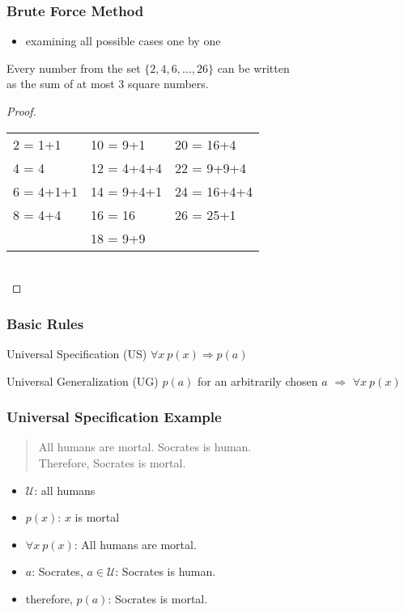 \documentclass[dvipsnames]{beamer}
\begin{document}
\begin{frame}
  \frametitle{Brute Force Method}

  \begin{itemize}
    \item examining all possible cases one by one
  \end{itemize}

  \pause
  \begin{theorem}
    Every number from the set $\{2,4,6,\dots,26\}$ can be written\\
    as the sum of at most 3 square numbers.
  \end{theorem}

  \pause
  \begin{proof}
    \begin{tabular}{lll}
      2 = 1+1   & 10 = 9+1    & 20 = 16+4\\
      4 = 4     & 12 = 4+4+4  & 22 = 9+9+4\\
      6 = 4+1+1 & 14 = 9+4+1  & 24 = 16+4+4\\
      8 = 4+4   & 16 = 16     & 26 = 25+1\\
                & 18 = 9+9    &
    \end{tabular}\\
  \end{proof}
\end{frame}

\begin{frame}
  \frametitle{Basic Rules}

  \begin{block}{Universal Specification (US)}
    $\forall x~p(x) \Rightarrow p(a)$
  \end{block}

  \pause
  \begin{block}{Universal Generalization (UG)}
    $p(a)$ for an \alert{arbitrarily chosen} $a$
      $\Rightarrow$ $\forall x~p(x)$
  \end{block}
\end{frame}

\begin{frame}
  \frametitle{Universal Specification Example}

  \begin{example}
    \begin{quote}
      All humans are mortal. Socrates is human.\\
      Therefore, Socrates is mortal.
    \end{quote}

    \pause
    \begin{itemize}
      \item $\mathcal{U}$: all humans
      \item $p(x)$: $x$ is mortal
      \item $\forall x~p(x)$: All humans are mortal.
      \item $a$: Socrates, $a \in \mathcal{U}$: Socrates is human.
      \item therefore, $p(a)$: Socrates is mortal.
    \end{itemize}
  \end{example}
\end{frame}
\end{document}
